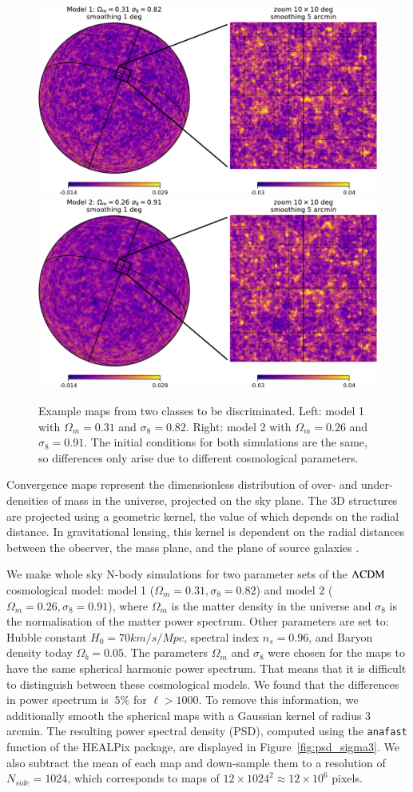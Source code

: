 \documentclass[final,twocolumn,3p,times,sort&compress]{elsarticle}
\newcommand{\figref}[1]{Figure~\ref{fig:#1}}
\newcommand{\1}{\b{1}}              %
\newcommand{\0}{\b{0}}              %
\begin{document}
\begin{figure}
	\centering
	\includegraphics[width=0.48\linewidth]{figure_kappa_diff_model1}
	\hfill
	\includegraphics[width=0.48\linewidth]{figure_kappa_diff_model2}
	\caption{Example maps from two classes to be discriminated. Left: model 1 with $\Omega_m=0.31$ and $\sigma_8=0.82$. Right: model 2 with $\Omega_m=0.26$ and $\sigma_8=0.91$.
	The initial conditions for both simulations are the same, so differences only arise due to different cosmological parameters.}
	\label{fig:map_sample}
\end{figure}

Convergence maps represent the dimensionless distribution of over- and under-densities of mass in the universe, projected on the sky plane.
The 3D structures are projected using a geometric kernel, the value of which depends on the radial distance.
In gravitational lensing, this kernel is dependent on the radial distances between the observer, the mass plane, and the plane of source galaxies \citep[see][for a review of gravitational lensing]{bartelman2010gravitationallensing}.

We make whole sky N-body simulations for two parameter sets of the $\Lambda\rm{CDM}$ cosmological model: model 1 ($\Omega_m=0.31, \sigma_8=0.82$) and model 2 ($\Omega_m=0.26, \sigma_8=0.91$), where $\Omega_m$ is the matter density in the universe and $\sigma_8$ is the normalisation of the matter power spectrum.
Other parameters are set to: Hubble constant $H_0=70 km/s/Mpc$, spectral index $n_s=0.96$, and Baryon density today $\Omega_b=0.05$.
The parameters $\Omega_m$ and $\sigma_8$ were chosen for the maps to have the same spherical harmonic power spectrum.
That means that it is difficult to distinguish between these cosmological models.
We found that the differences in power spectrum is $~5\%$ for $\ell>1000$.
To remove this information, we additionally smooth the spherical maps with a Gaussian kernel of radius $3$ arcmin.
The resulting power spectral density (PSD), computed using the \texttt{anafast} function of the HEALPix package, are displayed in \figref{psd_sigma3}.
We also subtract the mean of each map and down-sample them to a resolution of $N_{side}=1024$, which corresponds to maps of $12 \times 1024^2 \approx 12 \times 10^6$ pixels.
\end{document}
